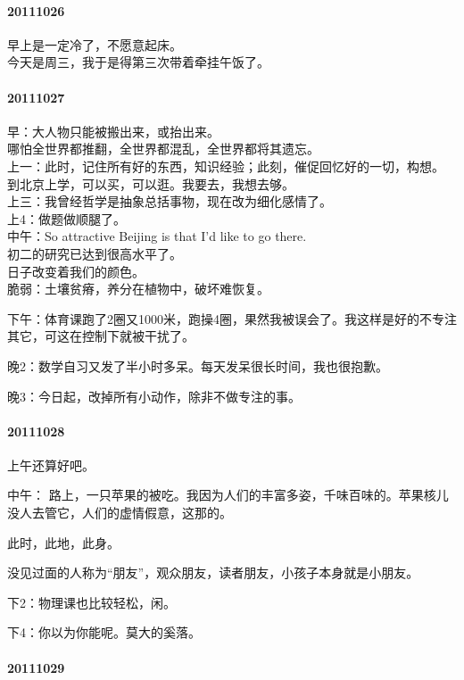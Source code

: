 \documentclass[UTF8]{Diaries}
\begin{document}
\paragraph{20111026}
早上是一定冷了，不愿意起床。\\
今天是周三，我于是得第三次带着牵挂午饭了。

\paragraph{20111027}
早：大人物只能被搬出来，或抬出来。\\
哪怕全世界都推翻，全世界都混乱，全世界都将其遗忘。\\

上一：此时，记住所有好的东西，知识经验；此刻，催促回忆好的一切，构想。\\
到北京上学，可以买，可以逛。我要去，我想去够。\\

上三：我曾经哲学是抽象总括事物，现在改为细化感情了。\\

上4：做题做顺腿了。\\

中午：So attractive Beijing is that I'd like to go there.\\
初二的研究已达到很高水平了。\\
日子改变着我们的颜色。\\
脆弱：土壤贫瘠，养分在植物中，破坏难恢复。

下午：体育课跑了2圈又1000米，跑操4圈，果然我被误会了。我这样是好的不专注其它，可这在控制下就被干扰了。

晚2：数学自习又发了半小时多呆。每天发呆很长时间，我也很抱歉。

晚3：今日起，改掉所有小动作，除非不做专注的事。

\paragraph{20111028}
上午还算好吧。

中午： 路上，一只苹果的被吃。我因为人们的丰富多姿，千味百味的。苹果核儿没人去管它，人们的虚情假意，这那的。

此时，此地，此身。

没见过面的人称为“朋友”，观众朋友，读者朋友，小孩子本身就是小朋友。

下2：物理课也比较轻松，闲。

下4：你以为你能呢。莫大的奚落。


\paragraph{20111029}
\end{document}

